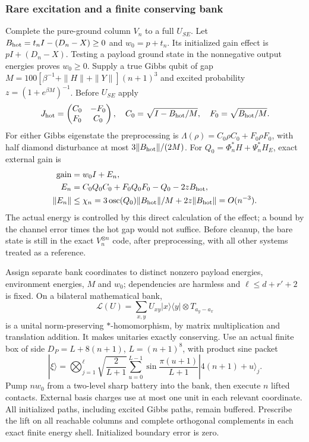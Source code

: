 \documentclass[11pt]{article}
\theoremstyle{definition}
\theoremstyle{remark}
\providecommand{\osc}{\operatorname{osc}}
\begin{document}
\subsubsection{Rare excitation and a finite conserving bank}
Complete the pure-ground column $V_n$ to a full $U_{SE}$.
Let $B_{\rm hot}=t_nI-(D_n-X)\ge0$ and $w_0=p+t_n$.
Its initialized gain effect is $pI+(D_n-X)$. Testing a payload
ground state in the nonnegative output energies proves $w_0\ge0$.
Supply a true Gibbs qubit of gap
$M=100[\beta^{-1}+\|H\|+\|Y\|](n+1)^3$ and excited probability
$z=(1+e^{\beta M})^{-1}$. Before $U_{SE}$ apply
\[
 J_{\rm hot}=\begin{pmatrix}C_0&-F_0\\F_0&C_0\end{pmatrix},
 \quad C_0=\sqrt{I-B_{\rm hot}/M},\quad F_0=\sqrt{B_{\rm hot}/M}.
\]
For either Gibbs eigenstate the preprocessing is
$\Lambda(\rho)=C_0\rho C_0+F_0\rho F_0$, with half diamond disturbance
at most $3\|B_{\rm hot}\|/(2M)$.
For $Q_0=\Phi_n^*H+\Psi_n^*H_E$, exact external gain is
\[
 \begin{aligned}
 \text{gain}&=w_0I+E_n,\\
 E_n&=C_0Q_0C_0+F_0Q_0F_0-Q_0-2zB_{\rm hot},\\
 \|E_n\|&\le\chi_n
 =3\osc(Q_0)\|B_{\rm hot}\|/M+2z\|B_{\rm hot}\|=O(n^{-3}).
 \end{aligned}
\]
The actual energy is controlled by this direct calculation of the effect;
a bound by the channel error times the hot gap would not suffice. Before cleanup, the bare state is still in
the exact $V_n^{\otimes n}$ code, after preprocessing, with all
other systems treated as a reference.

Assign separate bank coordinates to distinct nonzero payload energies,
environment energies, $M$ and $w_0$; dependencies are harmless and
$\ell\le d+r'+2$ is fixed. On a bilateral mathematical bank,
\[
 \mathcal L(U)=\sum_{x,y}U_{xy}|x\rangle\langle y|
                         \otimes T_{a_y-a_x}
\]
is a unital norm-preserving $*$-homomorphism, by matrix multiplication
and translation addition. It makes unitaries exactly conserving.
Use an actual finite box of side $D_P=L+8(n+1)$, $L=(n+1)^8$,
with product sine packet
\[
 |\xi\rangle=\bigotimes_{j=1}^{\ell}
 \sqrt{\frac2{L+1}}\sum_{u=0}^{L-1}
 \sin\frac{\pi(u+1)}{L+1}|4(n+1)+u\rangle_j .
\]
Pump $nw_0$ from a two-level sharp battery into the bank, then execute
$n$ lifted contacts. External basis charges use at most one unit in
each relevant coordinate. All initialized paths, including excited
Gibbs paths, remain buffered. Prescribe the lift on all reachable
columns and complete orthogonal complements in each exact finite
energy shell. Initialized boundary error is zero.
\end{document}
